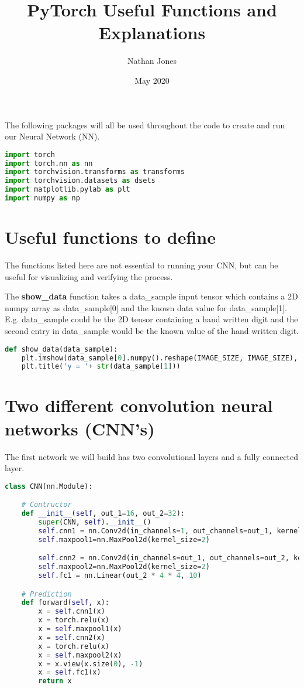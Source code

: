 \documentclass[12pt]{extarticle}
\title{PyTorch Useful Functions and Explanations}
\author{Nathan Jones}
\date{May 2020}
\newcommand{\<}{\langle}
\renewcommand{\>}{\rangle}
\theoremstyle{definition}
\newcommand{\newpara}{	\vskip 0.5cm }
\begin{document}
	
	\maketitle

The following packages will all be used throughout the code to create and run our Neural Network (NN).
	
\begin{lstlisting}[language= Python]
import torch 
import torch.nn as nn
import torchvision.transforms as transforms
import torchvision.datasets as dsets
import matplotlib.pylab as plt
import numpy as np
\end{lstlisting}

\section{Useful functions to define}

The functions listed here are not essential to running your CNN, but can be useful for visualizing and verifying the process. \newpara

The \textbf{show\_data} function takes a data\_sample input tensor which contains a 2D numpy array as data\_sample[0] and the known data value for data\_sample[1]. E.g. data\_sample could be the 2D tensor containing a hand written digit and the second entry in data\_sample would be the known value of the hand written digit.

\begin{lstlisting}[language=Python]
def show_data(data_sample):
	plt.imshow(data_sample[0].numpy().reshape(IMAGE_SIZE, IMAGE_SIZE), cmap='gray')
	plt.title('y = '+ str(data_sample[1]))
\end{lstlisting}

\section{Two different convolution neural networks (CNN's)}

The first network we will build has two convolutional layers and a fully connected layer.
\begin{lstlisting}[language=Python]
class CNN(nn.Module):

	# Contructor
	def __init__(self, out_1=16, out_2=32):
		super(CNN, self).__init__()
		self.cnn1 = nn.Conv2d(in_channels=1, out_channels=out_1, kernel_size=5, padding=2)
		self.maxpool1=nn.MaxPool2d(kernel_size=2)

		self.cnn2 = nn.Conv2d(in_channels=out_1, out_channels=out_2, kernel_size=5, stride=1, padding=2)
		self.maxpool2=nn.MaxPool2d(kernel_size=2)
		self.fc1 = nn.Linear(out_2 * 4 * 4, 10)

	# Prediction
	def forward(self, x):
		x = self.cnn1(x)
		x = torch.relu(x)
		x = self.maxpool1(x)
		x = self.cnn2(x)
		x = torch.relu(x)
		x = self.maxpool2(x)
		x = x.view(x.size(0), -1)
		x = self.fc1(x)
		return x
\end{lstlisting}
\end{document}
